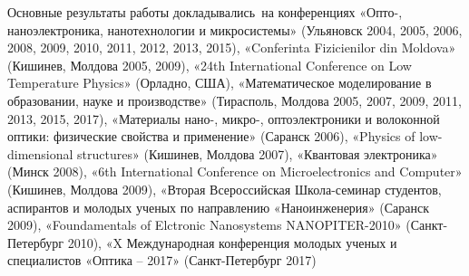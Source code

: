 {\probation}
Основные результаты работы докладывались~на конференциях «Опто-, наноэлектроника, нанотехнологии и микросистемы» (Ульяновск 2004, 2005, 2006, 2008, 2009, 2010, 2011, 2012, 2013, 2015), «Conferinta Fizicienilor din Moldova» (Кишинев, Молдова 2005, 2009), «24th International Conference on Low Temperature Physics» (Орладно, США), «Математическое моделирование в образовании, науке и производстве» (Тирасполь, Молдова 2005, 2007, 2009, 2011, 2013, 2015, 2017), «Материалы нано-, микро-, оптоэлектроники и волоконной оптики: физические свойства и применение» (Саранск 2006), «Physics of low-dimensional structures» (Кишинев, Молдова 2007), «Квантовая электроника» (Минск 2008), «6th International Conference on Microelectronics and Computer» (Кишинев, Молдова 2009), «Вторая Всероссийская Школа-семинар студентов, аспирантов и молодых ученых по направлению «Наноинженерия» (Саранск 2009), «Foundamentals of Elctronic Nanosystems NANOPITER-2010» (Санкт-Петербург 2010), «X Международная конференция молодых ученых и специалистов «Оптика – 2017» (Санкт-Петербург 2017)



